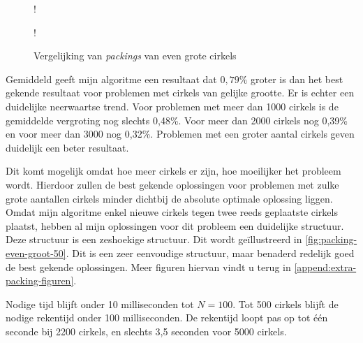 \documentclass[12pt,a4paper,oneside]{book}
\begin{document}
\begin {figure}
	\centering
	 {!} {
	}
	 {!} {
	}
	\caption{Vergelijking van \textit{packings} van even grote cirkels}
	\label{fig:vergelijking-even-grote-cirkels}
\end {figure}

Gemiddeld geeft mijn algoritme een resultaat dat $0,79\%$ groter is dan het best gekende resultaat voor problemen met cirkels van gelijke grootte.
Er is echter een duidelijke neerwaartse trend.
Voor problemen met meer dan 1000 cirkels is de gemiddelde vergroting nog slechts 0,48\%.
Voor meer dan 2000 cirkels nog 0,39\% en voor meer dan 3000 nog 0,32\%.
Problemen met een groter aantal cirkels geven duidelijk een beter resultaat.

Dit komt mogelijk omdat hoe meer cirkels er zijn, hoe moeilijker het probleem wordt.
Hierdoor zullen de best gekende oplossingen voor problemen met zulke grote aantallen cirkels minder dichtbij de absolute optimale oplossing liggen.
Omdat mijn algoritme enkel nieuwe cirkels tegen twee reeds geplaatste cirkels plaatst, hebben al mijn oplossingen voor dit probleem een duidelijke structuur.
Deze structuur is een zeshoekige structuur.
Dit wordt geïllustreerd in \autoref{fig:packing-even-groot-50}.
Dit is een zeer eenvoudige structuur, maar benaderd redelijk goed de best gekende oplossingen.
Meer figuren hiervan vindt u terug in \autoref{append:extra-packing-figuren}.

Nodige tijd blijft onder 10 milliseconden tot $N=100$.
Tot 500 cirkels blijft de nodige rekentijd onder 100 milliseconden.
De rekentijd loopt pas op tot één seconde bij 2200 cirkels, en slechts 3,5 seconden voor 5000 cirkels.
\end{document}
